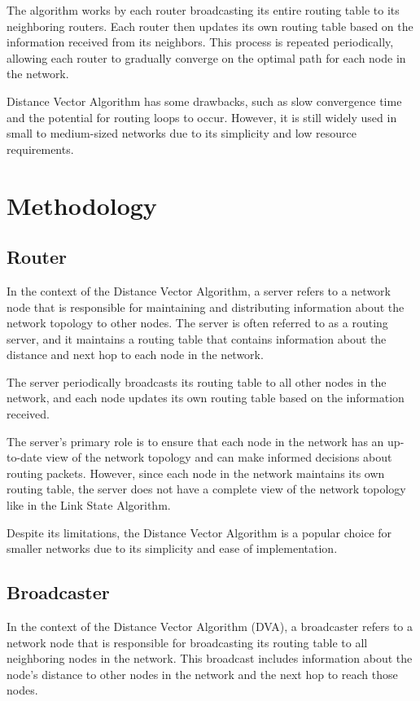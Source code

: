 \documentclass[11pt]{article}
\begin{document}
The algorithm works by each router broadcasting its entire routing table to its neighboring routers. Each router then updates its own routing table based on the information received from its neighbors. This process is repeated periodically, allowing each router to gradually converge on the optimal path for each node in the network.

Distance Vector Algorithm has some drawbacks, such as slow convergence time and the potential for routing loops to occur. However, it is still widely used in small to medium-sized networks due to its simplicity and low resource requirements.

\section{Methodology}

\subsection{Router}

In the context of the Distance Vector Algorithm, a server refers to a network node that is responsible for maintaining and distributing information about the network topology to other nodes. The server is often referred to as a routing server, and it maintains a routing table that contains information about the distance and next hop to each node in the network.

The server periodically broadcasts its routing table to all other nodes in the network, and each node updates its own routing table based on the information received.

The server's primary role is to ensure that each node in the network has an up-to-date view of the network topology and can make informed decisions about routing packets. However, since each node in the network maintains its own routing table, the server does not have a complete view of the network topology like in the Link State Algorithm.

Despite its limitations, the Distance Vector Algorithm is a popular choice for smaller networks due to its simplicity and ease of implementation.


\subsection{Broadcaster}

In the context of the Distance Vector Algorithm (DVA), a broadcaster refers to a network node that is responsible for broadcasting its routing table to all neighboring nodes in the network. This broadcast includes information about the node's distance to other nodes in the network and the next hop to reach those nodes.
\end{document}
